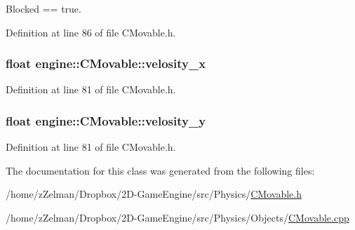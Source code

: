 Blocked == true. 



Definition at line 86 of file C\-Movable.\-h.

\hypertarget{classengine_1_1CMovable_a7bc34defa8ea4190a6c3011ef254e48b}{
\subsubsection[{velosity\-\_\-x}]{\setlength{\rightskip}{0pt plus 5cm}float engine\-::\-C\-Movable\-::velosity\-\_\-x\hspace{0.3cm}{\ttfamily [protected]}}}\label{classengine_1_1CMovable_a7bc34defa8ea4190a6c3011ef254e48b}


Definition at line 81 of file C\-Movable.\-h.

\hypertarget{classengine_1_1CMovable_a7a1a4581926122ae31753261d1d35cf3}{
\subsubsection[{velosity\-\_\-y}]{\setlength{\rightskip}{0pt plus 5cm}float engine\-::\-C\-Movable\-::velosity\-\_\-y\hspace{0.3cm}{\ttfamily [protected]}}}\label{classengine_1_1CMovable_a7a1a4581926122ae31753261d1d35cf3}


Definition at line 81 of file C\-Movable.\-h.



The documentation for this class was generated from the following files\-:\begin{DoxyCompactItemize}
\item 
/home/z\-Zelman/\-Dropbox/2\-D-\/\-Game\-Engine/src/\-Physics/\hyperlink{CMovable_8h}{C\-Movable.\-h}\item 
/home/z\-Zelman/\-Dropbox/2\-D-\/\-Game\-Engine/src/\-Physics/\-Objects/\hyperlink{CMovable_8cpp}{C\-Movable.\-cpp}\end{DoxyCompactItemize}

